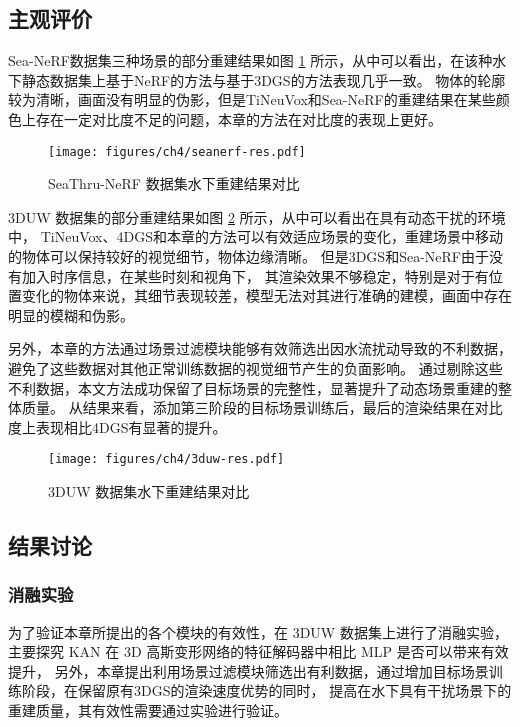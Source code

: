 \subsection{主观评价}
Sea-NeRF\cite{seathru}数据集三种场景的部分重建结果如图 \ref{img:res_seanerf} 所示，从中可以看出，在该种水下静态数据集上基于NeRF的方法与基于3DGS的方法表现几乎一致。
物体的轮廓较为清晰，画面没有明显的伪影，但是TiNeuVox\cite{tineuvox}和Sea-NeRF\cite{seathru}的重建结果在某些颜色上存在一定对比度不足的问题，本章的方法在对比度的表现上更好。
\begin{figure}
    \vspace{1mm}
    \centering
    \texttt{[image: figures/ch4/seanerf-res.pdf]}
    \caption{SeaThru-NeRF 数据集水下重建结果对比}
    \label{img:res_seanerf}
\end{figure}

3DUW 数据集的部分重建结果如图 \ref{img:res_3duw} 所示，从中可以看出在具有动态干扰的环境中，
TiNeuVox\cite{tineuvox}、4DGS\cite{4DGS}和本章的方法可以有效适应场景的变化，重建场景中移动的物体可以保持较好的视觉细节，物体边缘清晰。
但是3DGS\cite{3DGS}和Sea-NeRF\cite{seathru}由于没有加入时序信息，在某些时刻和视角下，
其渲染效果不够稳定，特别是对于有位置变化的物体来说，其细节表现较差，模型无法对其进行准确的建模，画面中存在明显的模糊和伪影。


另外，本章的方法通过场景过滤模块能够有效筛选出因水流扰动导致的不利数据，避免了这些数据对其他正常训练数据的视觉细节产生的负面影响。
通过剔除这些不利数据，本文方法成功保留了目标场景的完整性，显著提升了动态场景重建的整体质量。
从结果来看，添加第三阶段的目标场景训练后，最后的渲染结果在对比度上表现相比4DGS\cite{4DGS}有显著的提升。


\begin{figure}
    \centering
    \texttt{[image: figures/ch4/3duw-res.pdf]}
    \caption{3DUW 数据集水下重建结果对比}
    \label{img:res_3duw}
\end{figure}



\subsection{结果讨论}
\subsubsection{消融实验}
为了验证本章所提出的各个模块的有效性，在 3DUW 数据集上进行了消融实验，
主要探究 KAN 在 3D 高斯变形网络的特征解码器中相比 MLP 是否可以带来有效提升，
另外，本章提出利用场景过滤模块筛选出有利数据，通过增加目标场景训练阶段，在保留原有3DGS的渲染速度优势的同时，
提高在水下具有干扰场景下的重建质量，其有效性需要通过实验进行验证。

